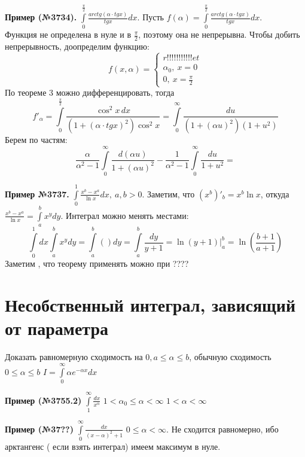  \textbf{Пример (№3734).}
 $\int\limits_{0}^{\frac{\pi}{2}} \frac{arctg(\alpha\cdot tg x)}{tg x}dx $.
Пусть $f(\alpha)=\int\limits_{0}^{\frac{\pi}{2}}
\frac{arctg(\alpha\cdot tg x)}{tg x}dx$.\\
Функция не определена в нуле и в $\frac{\pi}{2}$, поэтому она не непрерывна. 
Чтобы добить непрерывность, доопределим функцию:
$$f(x,\alpha)=\begin{cases}
    r!!!!!!!!!!!et\\
\alpha_0,~x=0\\
0,~x=\frac{\pi}{2}
\end{cases}$$
По теореме 3 можно дифференцировать, тогда 
$$f'_\alpha=
\int\limits_{0}^{\frac{\pi}{2}} \frac{\cos^2x\,dx}
{(1+(\alpha\cdot tgx)^2)\cos^2x}=
\int\limits_{0}^{\infty}\frac{du}{(1+(\alpha u)^2)(1+u^2)} $$
Берем по частям:
$$\frac{\alpha}{\alpha^2-1}\int\limits_{0}^{\infty} \frac{d(\alpha u)}{
1+(\alpha u)^2}-\frac{1}{\alpha^2-1}\int\limits_{0}^{\infty}\frac{du}{
1+u^2} =$$




\textbf{Пример №3737.} $\int\limits_{0}^{1} \frac{x^b-x^a}{\ln x}dx,~a,b>0$.
Заметим, что $(x^b)'_b=x^b\ln x$, откуда $\frac{x^b-x^a}{\ln x}=
\int\limits_{a}^{b}x^ydy$.
Интеграл можно менять местами: 
$$\int\limits_{0}^{1} dx \int\limits_{a}^{b} x^ydy=\int\limits_{a}^{b} 
\left(  \right) dy=\int\limits_{a}^{b} \frac{dy}{y+1}=\ln(y+1)\Big|^b_a=
\ln\left( \frac{b+1}{a+1} \right) $$ 
Заметим , что теорему применять можно при ????

\section{Несобственный интеграл, зависящий от параметра}



Доказать равномерную сходимость на $0,a\leqslant \alpha\leqslant b$,
обычную сходимость $0\leqslant \alpha\leqslant b$
$I=\int\limits_{0}^{\infty}\alpha e^{-\alpha x}dx$


\textbf{Пример (№3755.2)}  $\int\limits_{1}^{\infty} \frac{dx}{x^\alpha}$ 
$1<\alpha_0\leqslant \alpha<\infty$
$1<\alpha<\infty$

\textbf{Пример (№37??)} $\int\limits_{0}^{\infty}\frac{dx}{(x-\alpha)^2+1}$ 
$0\leqslant \alpha<\infty$. Не сходится равномерно, ибо арктангенс (
если взять интеграл) имеем максимум в нуле. 



